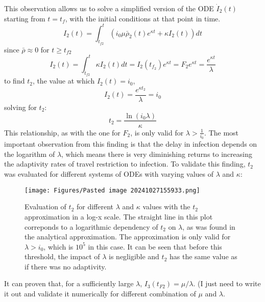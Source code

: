 \documentclass{article}
\begin{document}
This observation allows us to solve a simplified version of the ODE $\dot I_2(t)$ starting from $t=t_f$, with the initial conditions at that point in time.
$$ I_2(t) = \int_{t_{f2}}^t \left(i_{0} \mu \bar \rho_{2}{(t)} e^{\kappa t} + \kappa I_{2}{\left(t \right)}\right) dt$$
since $\bar \rho \approx 0$ for $t\ge t_{f2}$ 
$$I_2(t) = \int_{t_{f2}}^t  \kappa I_{2}{\left(t \right)} dt = I_2(t_{f_2})e^{\kappa t} = F_2 e^{\kappa t} =\frac{e^{\kappa t}}{\lambda}$$
to find $t_2$, the value at which $I_2(t)=i_0$, 
$$I_2(t) =\frac{e^{\kappa t_2}}{\lambda}=i_0$$
solving for $t_2$:
$$t_2=\frac{\ln(i_0 \lambda)}{\kappa}$$
This relationship, as with the one for $F_2$, is only valid for $\lambda> \frac{1}{i_0}$. The most important observation from this finding is that the delay in infection depends on the logarithm of $\lambda$, which means there is very diminishing returns to increasing the adaptivity rates of travel restriction to infection. To validate this finding, $t_2$ was evaluated for different systems of ODEs with varying values of $\lambda$ and $\kappa$:

\begin{figure}[h!]
    \centering
    \texttt{[image: Figures/Pasted image 20241027155933.png]}
    \caption{\small Evaluation of $t_2$ for different $\lambda$ and $\kappa$ values with the $t_2$ approximation in a log-x scale. The straight line in this plot correponds to a logarithmic dependency of $t_2$ on $\lambda$, as was found in the analytical approximation. The approximation is only valid for $\lambda > i_0$, which is $10^5$ in this case. It can be seen that before this threshold, the impact of $\lambda$ is negligible and $t_2$ has the same value as if there was no adaptivity.}
\end{figure}

It can proven that, for a sufficiently large $\lambda$, $I_3(t_{F2})=\mu/\lambda$. (I just need to write it out and validate it numerically for different combination of $\mu$ and $\lambda$.
\end{document}
